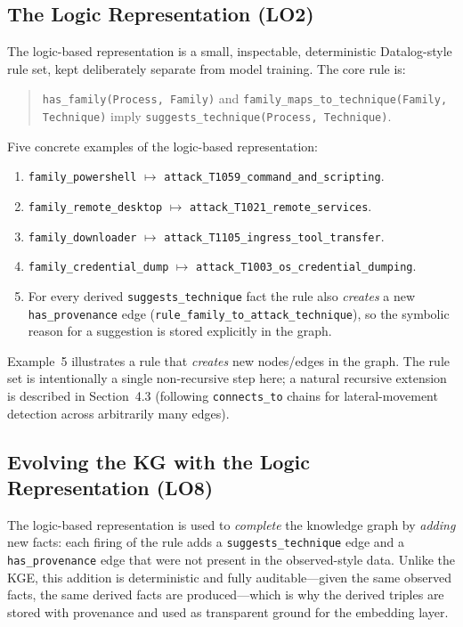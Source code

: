 \documentclass{article}
\begin{document}
\subsection{The Logic Representation (LO2)}
The logic-based representation is a small, inspectable, deterministic
Datalog-style rule set, kept deliberately separate from model training. The core
rule is:
\begin{quote}
\texttt{has\_family(Process, Family)} and
\texttt{family\_maps\_to\_technique(Family, Technique)} imply
\texttt{suggests\_technique(Process, Technique)}.
\end{quote}
Five concrete examples of the logic-based representation:
\begin{enumerate}
    \item \texttt{family\_powershell} $\mapsto$
    \texttt{attack\_T1059\_command\_and\_scripting}.
    \item \texttt{family\_remote\_desktop} $\mapsto$
    \texttt{attack\_T1021\_remote\_services}.
    \item \texttt{family\_downloader} $\mapsto$
    \texttt{attack\_T1105\_ingress\_tool\_transfer}.
    \item \texttt{family\_credential\_dump} $\mapsto$
    \texttt{attack\_T1003\_os\_credential\_dumping}.
    \item For every derived \texttt{suggests\_technique} fact the rule also
    \emph{creates} a new \texttt{has\_provenance} edge
    (\texttt{rule\_family\_to\_attack\_technique}), so the symbolic reason for a
    suggestion is stored explicitly in the graph.
\end{enumerate}
Example~5 illustrates a rule that \emph{creates} new nodes/edges in the graph.
The rule set is intentionally a single non-recursive step here; a natural
recursive extension is described in Section~4.3 (following
\texttt{connects\_to} chains for lateral-movement detection across arbitrarily
many edges).

\subsection{Evolving the KG with the Logic Representation (LO8)}
The logic-based representation is used to \emph{complete} the knowledge graph by
\emph{adding} new facts: each firing of the rule adds a
\texttt{suggests\_technique} edge and a \texttt{has\_provenance} edge that were
not present in the observed-style data. Unlike the KGE, this addition is
deterministic and fully auditable---given the same observed facts, the same
derived facts are produced---which is why the derived triples are stored with
provenance and used as transparent ground for the embedding layer.
\end{document}
